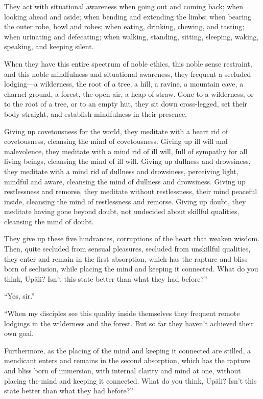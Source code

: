 \documentclass[12pt,openany]{book}%
\begin{document}
They act with situational awareness when going out and coming back; when looking ahead and aside; when bending and extending the limbs; when bearing the outer robe, bowl and robes; when eating, drinking, chewing, and tasting; when urinating and defecating; when walking, standing, sitting, sleeping, waking, speaking, and keeping silent. 

When they have this entire spectrum of noble ethics, this noble sense restraint, and this noble mindfulness and situational awareness, they frequent a secluded lodging—a wilderness, the root of a tree, a hill, a ravine, a mountain cave, a charnel ground, a forest, the open air, a heap of straw. Gone to a wilderness, or to the root of a tree, or to an empty hut, they sit down cross-legged, set their body straight, and establish mindfulness in their presence. 

Giving up covetousness for the world, they meditate with a heart rid of covetousness, cleansing the mind of covetousness. Giving up ill will and malevolence, they meditate with a mind rid of ill will, full of sympathy for all living beings, cleansing the mind of ill will. Giving up dullness and drowsiness, they meditate with a mind rid of dullness and drowsiness, perceiving light, mindful and aware, cleansing the mind of dullness and drowsiness. Giving up restlessness and remorse, they meditate without restlessness, their mind peaceful inside, cleansing the mind of restlessness and remorse. Giving up doubt, they meditate having gone beyond doubt, not undecided about skillful qualities, cleansing the mind of doubt. 

They give up these five hindrances, corruptions of the heart that weaken wisdom. Then, quite secluded from sensual pleasures, secluded from unskillful qualities, they enter and remain in the first absorption, which has the rapture and bliss born of seclusion, while placing the mind and keeping it connected. What do you think, \textsanskrit{Upāli}? Isn’t this state better than what they had before?” 

“Yes, sir.” 

“When my disciples see this quality inside themselves they frequent remote lodgings in the wilderness and the forest. But so far they haven’t achieved their own goal. 

Furthermore, as the placing of the mind and keeping it connected are stilled, a mendicant enters and remains in the second absorption, which has the rapture and bliss born of immersion, with internal clarity and mind at one, without placing the mind and keeping it connected. What do you think, \textsanskrit{Upāli}? Isn’t this state better than what they had before?” 
\end{document}
